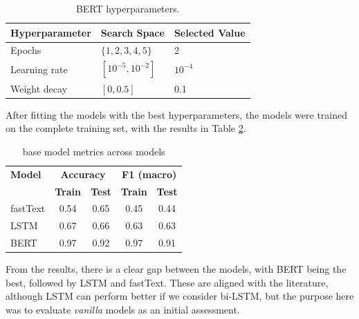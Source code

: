 \documentclass[conference]{IEEEtran}
\begin{document}
\begin{table}[H]
    \begin{subtable}[t]{0.45\textwidth}
        \centering
        \begin{tabular}{lll}
        \toprule
        \textbf{Hyperparameter} & \textbf{Search Space} & \textbf{Selected Value} \\
        \midrule
        Epochs & $\{1,2,3,4,5\}$ & 2 \\
        Learning rate & $[10^{-5}, 10^{-2}]$ & $10^{-4}$ \\
        Weight decay & $[0, 0.5]$ & 0.1 \\
        \bottomrule
        \end{tabular}
        \vspace{.3em}
        \caption{BERT hyperparameters.}
        \label{parameters_basebert}
    \end{subtable}
\end{table}


After fitting the models with the best hyperparameters, the models were trained on the complete training set, with the results in Table \ref{basemodel_models}.

\begin{table}[H]
\centering
\caption{base model metrics across models}
\label{basemodel_models}
\begin{tabular}{lcccc}
\toprule
\textbf{Model} & \multicolumn{2}{c}{\textbf{Accuracy}} & \multicolumn{2}{c}{\textbf{F1 (macro)}} \\
\cmidrule(lr){2-3} \cmidrule(lr){4-5}
 & \textbf{Train} & \textbf{Test} & \textbf{Train} & \textbf{Test} \\
\midrule
fastText & 0.54 & 0.65 & 0.45 & 0.44 \\
LSTM & 0.67 & 0.66 & 0.63 & 0.63 \\
BERT & 0.97 & 0.92 & 0.97 & 0.91 \\
\bottomrule
\end{tabular}
\end{table}

From the results, there is a clear gap between the models, with BERT being the best, followed by LSTM and fastText. These are aligned with the literature, although LSTM can perform better if we consider bi-LSTM, but the purpose here was to evaluate \textit{vanilla} models as an initial assessment.
\end{document}
